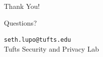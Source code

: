 \documentclass[smaller]{beamer}
\begin{document}
\begin{frame}
\begin{center}
\Huge Thank You!

\vspace{1cm}

\Large Questions?

\vspace{1cm}

\normalsize
\texttt{seth.lupo@tufts.edu}\\
\vspace{0.5cm}
Tufts Security and Privacy Lab

\end{center}
\end{frame}
\end{document}
